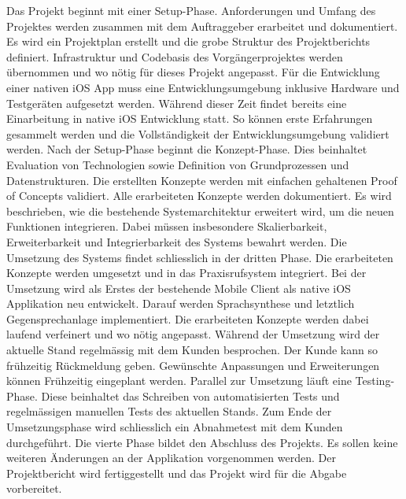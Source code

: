 Das Projekt beginnt mit einer Setup-Phase.
Anforderungen und Umfang des Projektes werden zusammen mit dem Auftraggeber erarbeitet und dokumentiert.
Es wird ein Projektplan erstellt und die grobe Struktur des Projektberichts definiert.
Infrastruktur und Codebasis des Vorgängerprojektes werden übernommen und wo nötig für dieses Projekt angepasst.
Für die Entwicklung einer nativen iOS App muss eine Entwicklungsumgebung inklusive Hardware und Testgeräten aufgesetzt werden.
Während dieser Zeit findet bereits eine Einarbeitung in native iOS Entwicklung statt.
So können erste Erfahrungen gesammelt werden und die Vollständigkeit der Entwicklungsumgebung validiert werden.
Nach der Setup-Phase beginnt die Konzept-Phase.
Dies beinhaltet Evaluation von Technologien sowie Definition von Grundprozessen und Datenstrukturen.
Die erstellten Konzepte werden mit einfachen gehaltenen Proof of Concepts validiert.
Alle erarbeiteten Konzepte werden dokumentiert.
Es wird beschrieben, wie die bestehende Systemarchitektur erweitert wird, um die neuen Funktionen integrieren.
Dabei müssen insbesondere Skalierbarkeit, Erweiterbarkeit und Integrierbarkeit des Systems bewahrt werden.
Die Umsetzung des Systems findet schliesslich in der dritten Phase.
Die erarbeiteten Konzepte werden umgesetzt und in das Praxisrufsystem integriert.
Bei der Umsetzung wird als Erstes der bestehende Mobile Client als native iOS Applikation neu entwickelt.
Darauf werden Sprachsynthese und letztlich Gegensprechanlage implementiert.
Die erarbeiteten Konzepte werden dabei laufend verfeinert und wo nötig angepasst.
Während der Umsetzung wird der aktuelle Stand regelmässig mit dem Kunden besprochen.
Der Kunde kann so frühzeitig Rückmeldung geben.
Gewünschte Anpassungen und Erweiterungen können Frühzeitig eingeplant werden.
Parallel zur Umsetzung läuft eine Testing-Phase.
Diese beinhaltet das Schreiben von automatisierten Tests und regelmässigen manuellen Tests des aktuellen Stands.
Zum Ende der Umsetzungsphase wird schliesslich ein Abnahmetest mit dem Kunden durchgeführt.
Die vierte Phase bildet den Abschluss des Projekts.
Es sollen keine weiteren Änderungen an der Applikation vorgenommen werden.
Der Projektbericht wird fertiggestellt und das Projekt wird für die Abgabe vorbereitet.

